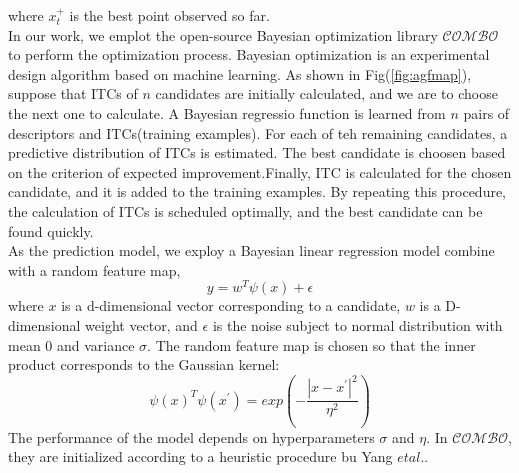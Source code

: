 where $x^{+}_t$ is the best point observed so far.\\
\indent In our work, we emplot the open-source Bayesian optimization library $\mathcal{COMBO}$\cite{ueno2016combo} to perform the optimization process. Bayesian optimization is an experimental design algorithm based on machine learning\cite{jones2001taxonomy}. As shown in Fig(\ref{fig:agfmap}), suppose that ITCs of $n$ candidates are initially calculated, and we are to choose the next one to calculate. A Bayesian regressio function is learned from $n$ pairs of descriptors and ITCs(training examples). For each of teh remaining candidates, a predictive distribution of ITCs is estimated. The best candidate is choosen based on the criterion of expected improvement\cite{jones2001taxonomy}.Finally, ITC is calculated for the chosen candidate, and it is added to the training examples. By repeating this procedure, the calculation of ITCs is scheduled optimally, and the best candidate can be found quickly.\\
\indent As the prediction model, we exploy a Bayesian linear regression model combine with a random feature map,
\begin{equation}
y=w^{T}\psi(x) +\epsilon
\end{equation}
where $x$ is a d-dimensional vector corresponding to a candidate, $w$ is a D-dimensional weight vector, and $\epsilon$ is the noise subject to normal distribution with mean 0 and variance $\sigma$. The random feature map is chosen so that the inner product corresponds to the Gaussian kernel\cite{rahimi2008random}:
\begin{equation}
\psi(x)^T\psi(x^{'})=exp(-\frac{|x-x^{'}|^2}{\eta^2})
\end{equation}
\indent The performance of the model depends on hyperparameters $\sigma$ and $\eta$. In $\mathcal{COMBO}$, they are initialized according to a heuristic procedure bu Yang $et al.$\cite{yang2015carte}. 
